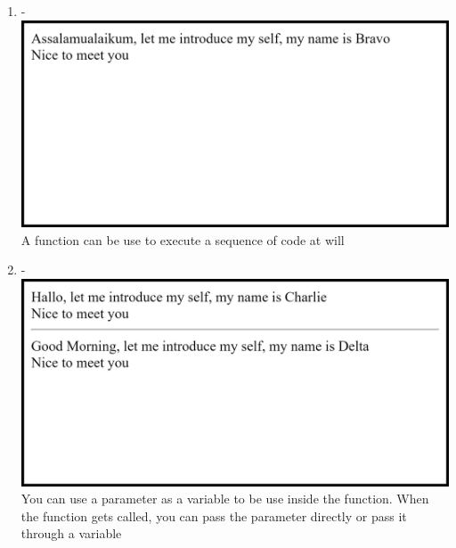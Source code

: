 \documentclass[12pt,titlepage]{article}
\begin{document}
\begin{enumerate}
    \item - \\ \includegraphics[width=.9\textwidth]{images/figures/fig4.png} \\ A function can be use to execute a sequence of code at will
    \item - \\ \includegraphics[width=.9\textwidth]{images/figures/fig5.png} \\ You can use a parameter as a variable to be use inside the function. When the function gets called, you can pass the parameter directly or pass it through a variable
    
    \newpage


\end{enumerate}
\end{document}
